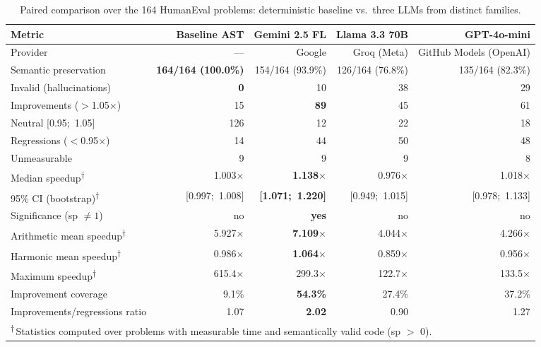 \documentclass[conference]{IEEEtran}
\begin{document}
\begin{table}[htbp]
\caption{Paired comparison over the 164 HumanEval problems: deterministic baseline vs.\ three LLMs from distinct families.}
\label{tab:llm_vs_base}
\centering
\footnotesize
\begin{tabular}{lrrrr}
\hline
\textbf{Metric} & \textbf{Baseline AST} & \textbf{Gemini 2.5 FL} & \textbf{Llama 3.3 70B} & \textbf{GPT-4o-mini} \\
\hline
Provider & --- & Google & Groq (Meta) & GitHub Models (OpenAI) \\
Semantic preservation & \textbf{164/164 (100.0\%)} & 154/164 (93.9\%) & 126/164 (76.8\%) & 135/164 (82.3\%) \\
Invalid (hallucinations) & \textbf{0} & 10 & 38 & 29 \\
Improvements ($>$1.05$\times$) & 15 & \textbf{89} & 45 & 61 \\
Neutral [0.95;~1.05] & 126 & 12 & 22 & 18 \\
Regressions ($<$0.95$\times$) & 14 & 44 & 50 & 48 \\
Unmeasurable & 9 & 9 & 9 & 8 \\
\hline
Median speedup\textsuperscript{$\dagger$} & 1.003$\times$ & \textbf{1.138$\times$} & 0.976$\times$ & 1.018$\times$ \\
95\% CI (bootstrap)\textsuperscript{$\dagger$} & [0.997;~1.008] & \textbf{[1.071;~1.220]} & [0.949;~1.015] & [0.978;~1.133] \\
Significance (sp $\ne 1$) & no & \textbf{yes} & no & no \\
Arithmetic mean speedup\textsuperscript{$\dagger$} & 5.927$\times$ & \textbf{7.109$\times$} & 4.044$\times$ & 4.266$\times$ \\
Harmonic mean speedup\textsuperscript{$\dagger$} & 0.986$\times$ & \textbf{1.064$\times$} & 0.859$\times$ & 0.956$\times$ \\
Maximum speedup\textsuperscript{$\dagger$} & 615.4$\times$ & 299.3$\times$ & 122.7$\times$ & 133.5$\times$ \\
\hline
Improvement coverage & 9.1\% & \textbf{54.3\%} & 27.4\% & 37.2\% \\
Improvements/regressions ratio & 1.07 & \textbf{2.02} & 0.90 & 1.27 \\
\hline
\multicolumn{5}{p{0.98\textwidth}}{\scriptsize \textsuperscript{$\dagger$}\,Statistics computed over problems with measurable time and semantically valid code (sp $>$ 0).} \\
\end{tabular}
\end{table}
\end{document}
